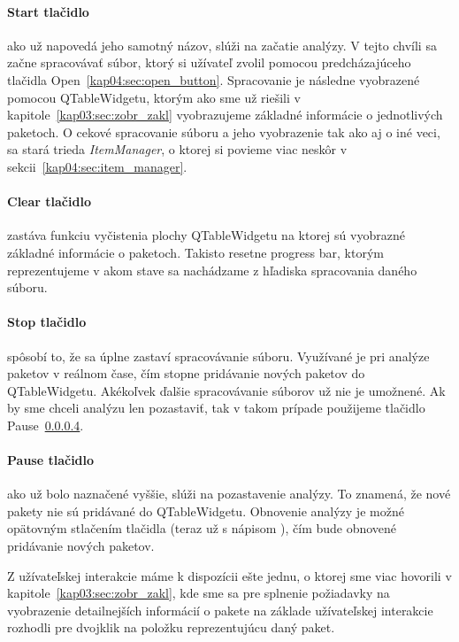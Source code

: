 \paragraph{Start tlačidlo}
\label{kap04:sec:start_button}

ako už napovedá jeho samotný názov, slúži na začatie analýzy. V tejto chvíli sa začne spracovávať súbor, ktorý si užívateľ zvolil pomocou predcházajúceho tlačidla Open~\ref{kap04:sec:open_button}. Spracovanie je následne vyobrazené pomocou QTableWidgetu, ktorým ako sme už riešili v kapitole~\ref{kap03:sec:zobr_zakl} vyobrazujeme základné informácie o jednotlivých paketoch. O cekové spracovanie súboru a jeho vyobrazenie tak ako aj o iné veci, sa stará trieda \textit{ItemManager}, o ktorej si povieme viac neskôr v sekcii~\ref{kap04:sec:item_manager}.

\paragraph{Clear tlačidlo}
\label{kap04:sec:clear_button}
zastáva funkciu vyčistenia plochy QTableWidgetu na ktorej sú vyobrazné základné informácie o paketoch. Takisto resetne progress bar, ktorým reprezentujeme v akom stave sa nachádzame z hľadiska spracovania daného súboru.

\paragraph{Stop tlačidlo}

spôsobí to, že sa úplne zastaví spracovávanie súboru. Využívané je pri analýze paketov v reálnom čase, čím stopne pridávanie nových paketov do QTableWidgetu. Akékoľvek ďalšie spracovávanie súborov už nie je umožnené. Ak by sme chceli analýzu len pozastaviť, tak v takom prípade použijeme tlačidlo Pause~\ref{kap04:sec:pause_button}.

\paragraph{Pause tlačidlo}
\label{kap04:sec:pause_button}

ako už bolo naznačené vyššie, slúži na pozastavenie analýzy. To znamená, že nové pakety nie sú pridávané do QTableWidgetu. Obnovenie analýzy je možné opätovným stlačením tlačidla (teraz už s nápisom ), čím bude obnovené pridávanie nových paketov.

Z užívateľskej interakcie máme k dispozícii ešte jednu, o ktorej sme viac hovorili v kapitole~\ref{kap03:sec:zobr_zakl}, kde sme sa pre splnenie požiadavky na vyobrazenie detailnejších informácií o pakete na základe užívateľskej interakcie rozhodli pre dvojklik na položku reprezentujúcu daný paket.

